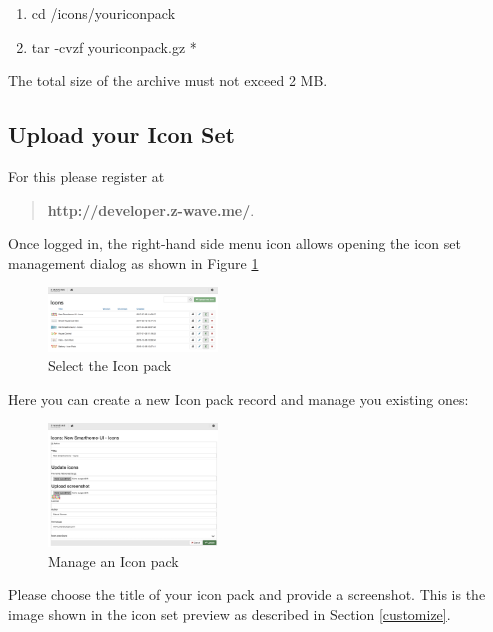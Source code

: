 \begin{enumerate}
\item cd /icons/youriconpack
\item tar -cvzf youriconpack.gz *
\end{enumerate}


The total size of the archive must not exceed 2 MB.

\subsection{Upload your Icon Set}

For this please register at

\begin{quote}
\textbf{http://developer.z-wave.me/}.
\end{quote}

Once logged in, the right-hand side menu icon allows opening the icon set management dialog as shown in Figure \ref{iconspack1}

\begin{figure}
\begin{center}
\includegraphics[width=0.4\textwidth]{pngs/cap10/iconserver.png}
\caption{Select the Icon pack}
\label{iconspack1}
\end{center}
\end{figure}

Here you can create a new Icon pack record and manage you existing ones:

\begin{figure}
\begin{center}
\includegraphics[width=0.4\textwidth]{pngs/cap10/iconserver2.png}
\caption{Manage an Icon pack}
\label{iconspack2}
\end{center}
\end{figure}

Please choose the title of your icon pack and provide a screenshot. This is the image shown 
in the icon set preview as described in Section \ref{customize}.


